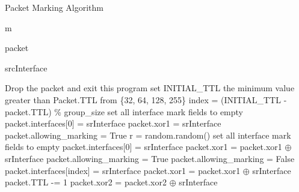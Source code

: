 \begin{algorithm}
    \small
    \caption{Packet Marking Algorithm}
        \begin{algorithmic}[1] %
            
            \Require m

            \Require  packet

            \Require srcInterface

               \State 
                Drop the packet and exit this program
            \Else   
                \State  set INITIAL\_TTL the minimum value greater than Packet.TTL from \{32, 64, 128, 255\}
                \State  index = (INITIAL\_TTL - packet.TTL) \% group\_size
                     \State
                        set all interface  mark fields to empty \State
                        packet.interfaces[0] = srInterface \State
                        packet.xor1 = srInterface \State
                        packet.allowing\_marking = True
                       \State
                        r = random.random()
                         \State
                            set all interface  mark fields to empty \State
                            packet.interfaces[0] = srInterface \State
                            packet.xor1 = packet.xor1 $\oplus$ srInterface \State
                            packet.allowing\_marking = True
                        \Else \State 
                            packet.allowing\_marking = False
                        \EndIf
                    \EndIf
                 \State
                    packet.interfaces[index] = srInterface \State
                    packet.xor1 = packet.xor1 $\oplus$ srInterface
                \EndIf  \State
                packet.TTL -= 1 \State
                packet.xor2 = packet.xor2 $\oplus$ srInterface
            \EndIf
            \State
        \end{algorithmic}
        \label{alg:packet_marking}
    \end{algorithm}